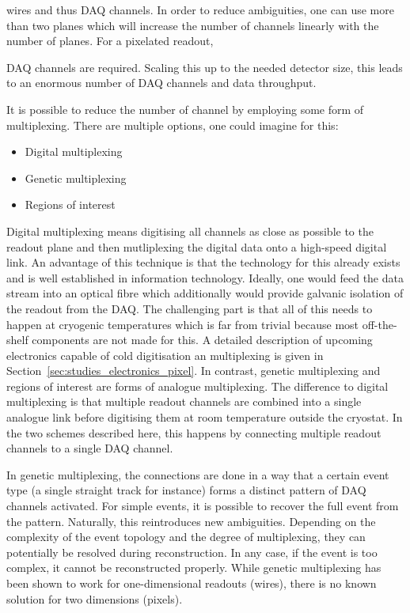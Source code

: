 
wires and thus DAQ channels.
In order to reduce ambiguities, one can use more than two planes which will increase the number of channels linearly with the number of planes.
For a pixelated readout,


DAQ channels are required.
Scaling this up to the needed detector size, this leads to an enormous number of DAQ channels and data throughput.

It is possible to reduce the number of channel by employing some form of multiplexing.
There are multiple options, one could imagine for this:
\begin{itemize}
	\item Digital multiplexing
	\item Genetic multiplexing
	\item Regions of interest
\end{itemize}

Digital multiplexing means digitising all channels as close as possible to the readout plane and then mutliplexing the digital data onto a high-speed digital link.
An advantage of this technique is that the technology for this already exists and is well established in information technology.
Ideally, one would feed the data stream into an optical fibre which additionally would provide galvanic isolation of the readout from the DAQ.
The challenging part is that all of this needs to happen at cryogenic temperatures which is far from trivial because most off-the-shelf components are not made for this.
A detailed description of upcoming electronics capable of cold digitisation an multiplexing is given in Section~\ref{sec:studies_electronics_pixel}.
In contrast, genetic multiplexing and regions of interest are forms of analogue multiplexing.
The difference to digital multiplexing is that multiple readout channels are combined into a single analogue link before digitising them at room temperature outside the cryostat.
In the two schemes described here, this happens by connecting multiple readout channels to a single DAQ channel.

In genetic multiplexing, the connections are done in a way that a certain event type (a single straight track for instance) forms a distinct pattern of DAQ channels activated.
For simple events, it is possible to recover the full event from the pattern.
Naturally, this reintroduces new ambiguities.
Depending on the complexity of the event topology and the degree of multiplexing, they can potentially be resolved during reconstruction.
In any case, if the event is too complex, it cannot be reconstructed properly.
While genetic multiplexing has been shown to work for one-dimensional readouts (wires), there is no known solution for two dimensions (pixels).

